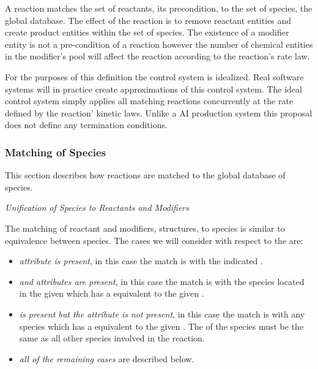 \documentclass{cekarticle}
\begin{document}
A reaction matches
the set of reactants, its precondition, to the set of species, the global database.  The effect of the
reaction is to remove reactant entities and create product entities within the set of species.
The existence of a modifier entity is not a pre-condition of a reaction however the number of
chemical entities in the modifier's pool will affect the reaction according to the reaction's
rate law.

For the purposes of this definition the control system is idealized. Real software systems will in
practice create approximations of this control system.  The ideal control system simply applies all
matching reactions concurrently at the rate defined by the reaction' kinetic laws.  Unlike a AI
production system this proposal does not define any termination conditions.  

\subsubsection{Matching of Species}

This section describes how reactions are matched to the global database of species.

\emph{Unification of Species to Reactants and Modifiers}

The matching of reactant and modifiers,  structures,
to species is similar to equivalence between species.  
The cases we will consider with respect to the  are:
\begin{itemize}

\item \emph{ attribute is present}, in this case the match is with the indicated
.

\item \emph{ and  attributes are present}, in this case the match is
with the species located in the given  which has a  equivalent to
the given .

\item \emph{ is present but the  attribute is not present},
in this case the match is
with any species which has a  equivalent to
the given .  The  of the species must be the same as
all other species involved in the reaction.

\item \emph{all of the remaining cases} are described below.
\end{itemize}
\end{document}
